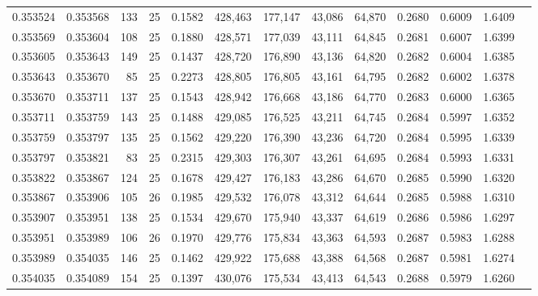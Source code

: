 \begin{tabular}{rrrrrrrrrrrrr}
0.353524 & 0.353568 &   133 &  25 &                                     0.1582 & 428,463 & 177,147 &  43,086 &  64,870 & 0.2680 & 0.6009 & 1.6409 \\
0.353569 & 0.353604 &   108 &  25 &                                     0.1880 & 428,571 & 177,039 &  43,111 &  64,845 & 0.2681 & 0.6007 & 1.6399 \\
0.353605 & 0.353643 &   149 &  25 &                                     0.1437 & 428,720 & 176,890 &  43,136 &  64,820 & 0.2682 & 0.6004 & 1.6385 \\
0.353643 & 0.353670 &    85 &  25 &                                     0.2273 & 428,805 & 176,805 &  43,161 &  64,795 & 0.2682 & 0.6002 & 1.6378 \\
0.353670 & 0.353711 &   137 &  25 &                                     0.1543 & 428,942 & 176,668 &  43,186 &  64,770 & 0.2683 & 0.6000 & 1.6365 \\
0.353711 & 0.353759 &   143 &  25 &                                     0.1488 & 429,085 & 176,525 &  43,211 &  64,745 & 0.2684 & 0.5997 & 1.6352 \\
0.353759 & 0.353797 &   135 &  25 &                                     0.1562 & 429,220 & 176,390 &  43,236 &  64,720 & 0.2684 & 0.5995 & 1.6339 \\
0.353797 & 0.353821 &    83 &  25 &                                     0.2315 & 429,303 & 176,307 &  43,261 &  64,695 & 0.2684 & 0.5993 & 1.6331 \\
0.353822 & 0.353867 &   124 &  25 &                                     0.1678 & 429,427 & 176,183 &  43,286 &  64,670 & 0.2685 & 0.5990 & 1.6320 \\
0.353867 & 0.353906 &   105 &  26 &                                     0.1985 & 429,532 & 176,078 &  43,312 &  64,644 & 0.2685 & 0.5988 & 1.6310 \\
0.353907 & 0.353951 &   138 &  25 &                                     0.1534 & 429,670 & 175,940 &  43,337 &  64,619 & 0.2686 & 0.5986 & 1.6297 \\
0.353951 & 0.353989 &   106 &  26 &                                     0.1970 & 429,776 & 175,834 &  43,363 &  64,593 & 0.2687 & 0.5983 & 1.6288 \\
0.353989 & 0.354035 &   146 &  25 &                                     0.1462 & 429,922 & 175,688 &  43,388 &  64,568 & 0.2687 & 0.5981 & 1.6274 \\
0.354035 & 0.354089 &   154 &  25 &                                     0.1397 & 430,076 & 175,534 &  43,413 &  64,543 & 0.2688 & 0.5979 & 1.6260 \\

\end{tabular}
